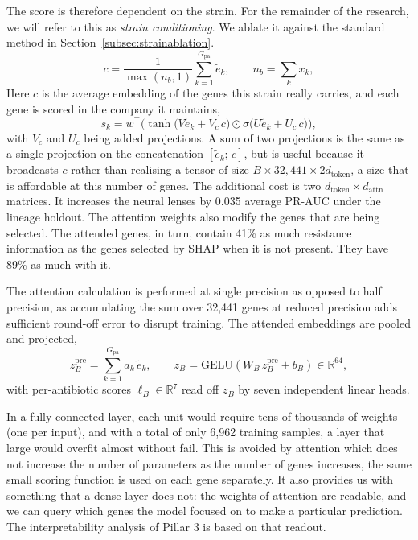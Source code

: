 \documentclass[journal]{IEEEtran}
\begin{document}
The score is therefore dependent on the strain. For the remainder of the research, we
will refer to this as \emph{strain conditioning}. We ablate it against the standard
method in Section~\ref{subsec:strainablation}.
\begin{equation}
c = \frac{1}{\max(n_b, 1)} \sum_{k=1}^{G_{\mathrm{pa}}} \tilde{e}_k,
\qquad n_b = \sum_k x_k,
\label{eq:expertB_ctx}
\end{equation}
Here $c$ is the average embedding of the genes this strain really carries, and each
gene is scored in the company it maintains,
\begin{equation}
s_k = w^\top\Big(\tanh\big(V \tilde{e}_k + V_c\, c\big) \odot
\sigma\big(U \tilde{e}_k + U_c\, c\big)\Big),
\label{eq:expertB_score}
\end{equation}
with $V_c$ and $U_c$ being added projections. A sum of two projections is the same as
a single projection on the concatenation $[\tilde{e}_k;\, c]$, but is useful because
it broadcasts $c$ rather than realising a tensor of size
$B \times 32{,}441 \times 2 d_{\mathrm{token}}$, a size that is affordable at this
number of genes. The additional cost is two
$d_{\mathrm{token}} \times d_{\mathrm{attn}}$ matrices. It increases the neural lenses
by 0.035 average PR-AUC under the lineage holdout. The attention weights also modify
the genes that are being selected. The attended genes, in turn, contain 41\% as much
resistance information as the genes selected by SHAP when it is not present. They have
89\% as much with it.

The attention calculation is performed at single precision as opposed to half
precision, as accumulating the sum over 32{,}441 genes at reduced precision adds
sufficient round-off error to disrupt training. The attended embeddings are pooled and
projected,
\begin{equation}
z_B^{\mathrm{pre}} = \sum_{k=1}^{G_{\mathrm{pa}}} a_k\, \tilde{e}_k,
\qquad
z_B = \mathrm{GELU}\!\left(W_B\, z_B^{\mathrm{pre}} + b_B\right) \in \mathbb{R}^{64},
\label{eq:expertB_out}
\end{equation}
with per-antibiotic scores $\ell_B \in \mathbb{R}^{7}$ read off $z_B$ by seven
independent linear heads.

In a fully connected layer, each unit would require tens of thousands of weights (one
per input), and with a total of only 6{,}962 training samples, a layer that large
would overfit almost without fail. This is avoided by attention which does not
increase the number of parameters as the number of genes increases, the same small
scoring function is used on each gene separately. It also provides us with something
that a dense layer does not: the weights of attention are readable, and we can query
which genes the model focused on to make a particular prediction. The
interpretability analysis of Pillar 3 is based on that readout.
\end{document}
